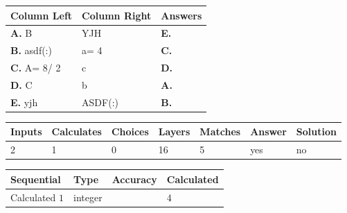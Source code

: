 \documentclass[12pt]{article}
\begin{document}
  
 
 
\noindent{}
  
  
\begin{tabular}{|l|l|l|}
 \hline
 Column Left & Column Right  & Answers       \\ 
 \hline
{\textbf{\large{
A.}}}
B
  & 
YJH
 & 
{\textbf{\large{
E.}}}
 \\ 
 \hline
{\textbf{\large{
B.}}}
asdf(:)
  & 
 a= %
4
 & 
{\textbf{\large{
C.}}}
 \\ 
 \hline
{\textbf{\large{
C.}}}
 A= %
8/ %
2

  & 
c
 & 
{\textbf{\large{
D.}}}
 \\ 
 \hline
{\textbf{\large{
D.}}}
C
  & 
b
 & 
{\textbf{\large{
A.}}}
 \\ 
 \hline
{\textbf{\large{
E.}}}
yjh
  & 
ASDF(:)
 & 
{\textbf{\large{
B.}}}
 \\ 
 \hline
 \end{tabular}
  
  
 
 
\noindent{}
 
 
 
   
   
   
   
\noindent\begin{tabular}{|l|l|l|l|l|l|l|}
 \hline
Inputs & Calculates & Choices & Layers & Matches & Answer & Solution \\ \hline
           2  & 
           1  & 
           0
  & 
          16  & 
           5  & 
  yes & 
  no 
  \\ \hline
 \end{tabular}
   
   
   
   
\noindent{}
   
   
  
  
\noindent\begin{tabular}{|l|l|l|l|}
\hline
 Sequential & Type & Accuracy & Calculated \\ 
\hline
 
 
  Calculated $            1 $ & integer &  & 
  $ 4 $ 
 \\  \hline  
 \end{tabular}
   
\end{document}
